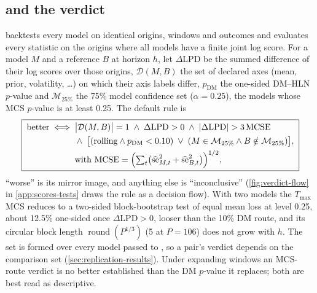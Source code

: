 \subsection{\texorpdfstring{}{compare()} and the verdict}\label{sec:eval-verdict}

 backtests every model on identical origins, windows and outcomes and evaluates
every statistic on the origins where all models have a finite joint log score.
For a model $M$ and a reference $B$ at horizon $h$, let $\Delta\mathrm{LPD}$ be the summed
difference of their log scores over those origins, $\mathcal D(M, B)$ the set of declared axes
(mean, prior, volatility, \dots) on which their axis labels differ, $p_{\mathrm{DM}}$ the one-sided
DM--HLN $p$-value and $\mathcal M_{25\%}$ the 75\% model confidence set ($\alpha = 0.25$), the
models whose MCS $p$-value is at least 0.25.
The default rule is
\begin{equation}\label{eq:verdict}
\boxed{\;
\begin{aligned}
  \text{better} \iff{} & \bigl|\mathcal D(M, B)\bigr| = 1
  \;\wedge\; \Delta\mathrm{LPD} > 0
  \;\wedge\; |\Delta\mathrm{LPD}| > 3\,\mathrm{MCSE}\\
  & \wedge\; \bigl[(\text{rolling} \wedge p_{\mathrm{DM}} < 0.10)
  \;\vee\; (M \in \mathcal M_{25\%} \wedge B \notin \mathcal M_{25\%})\bigr],\\
  & \text{with } \mathrm{MCSE} = \Bigl(\textstyle\sum_t \bigl(\widehat{\mathrm{se}}_{M,t}^2
  + \widehat{\mathrm{se}}_{B,t}^2\bigr)\Bigr)^{1/2},
\end{aligned}\;}
\end{equation}
``worse'' is its mirror image, and anything else is ``inconclusive'' (\cref{fig:verdict-flow} in
\cref{app:scores-tests} draws the rule as a decision flow).
With two models the $T_{\max}$ MCS reduces to a two-sided block-bootstrap test of equal mean loss
at level 0.25, about 12.5\% one-sided once $\Delta\mathrm{LPD} > 0$, looser than the 10\% DM route,
and its circular block length $\operatorname{round}(P^{1/3})$ (5 at $P = 106$) does not grow with
$h$. The set is formed over every model passed to , so a pair's verdict depends on
the comparison set (\cref{sec:replication-results}). Under expanding windows an MCS-route verdict
is no better established than the DM $p$-value it replaces; both are best read as descriptive.
